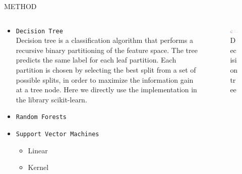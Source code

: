 \documentclass[final,hyperref={pdfpagelabels=false}]{beamer}
\begin{document}
\begin{frame}[t]
\begin{columns}[t]
\begin{column}{.465\textwidth}
\begin{block}{METHOD}
\begin{columns}
\begin{column}{.5\textwidth}
\begin{itemize}
\item \texttt{Decision Tree} \\
		Decision tree is a classification algorithm that performs a recursive binary partitioning of the feature space. The tree predicts the same label for each leaf partition. Each partition is chosen by selecting the best split from a set of possible splits, in order to maximize the information gain at a tree node. Here we directly use the implementation in the library scikit-learn.
\item \texttt{Random Forests}
		
	
	
\item \texttt{Support Vector Machines}
	\begin{itemize}
		\item Linear
		
		\item Kernel
	\end{itemize}
	

\end{itemize}

\end{column}

\begin{column}{.4\textwidth}

\begin{figure}
\includegraphics[width=1\linewidth]{decision_tree.png}
\caption{Decision tree}
\end{figure}

\end{column}

\end{columns}






\end{block}
\end{column}
\end{columns}
\end{frame}
\end{document}
